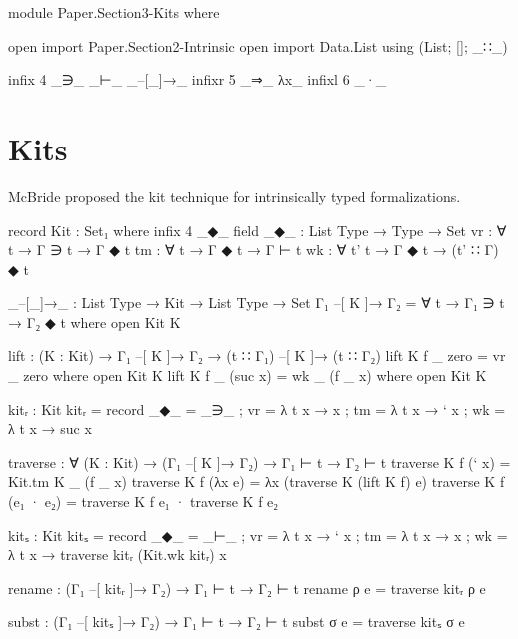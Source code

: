 \begin{code}[hide]
module Paper.Section3-Kits where

open import Paper.Section2-Intrinsic
open import Data.List using (List; []; _∷_)

infix  4  _∋_  _⊢_  _–[_]→_
infixr 5  _⇒_  λx_
infixl 6  _·_
\end{code}

\newpage
\section{Kits}

McBride proposed the kit technique for intrinsically typed formalizations.

\begin{code}
record Kit : Set₁ where
  infix 4 _◆_
  field
    _◆_  : List Type → Type → Set
    vr   : ∀ t → Γ ∋ t → Γ ◆ t
    tm   : ∀ t → Γ ◆ t → Γ ⊢ t
    wk   : ∀ {t'} t → Γ ◆ t → (t' ∷ Γ) ◆ t

_–[_]→_ : List Type → Kit → List Type → Set
Γ₁ –[ K ]→ Γ₂ = ∀ t → Γ₁ ∋ t → Γ₂ ◆ t where open Kit K

lift : (K : Kit) → Γ₁ –[ K ]→ Γ₂ → (t ∷ Γ₁) –[ K ]→ (t ∷ Γ₂)
lift K f _ zero    = vr _ zero     where open Kit K
lift K f _ (suc x) = wk _ (f _ x)  where open Kit K

kitᵣ : Kit
kitᵣ = record {  _◆_  =  _∋_
              ;  vr   = λ t x → x
              ;  tm   = λ t x → ` x
              ;  wk   = λ t x → suc x
              }

traverse : ∀ (K : Kit) → (Γ₁ –[ K ]→ Γ₂) → Γ₁ ⊢ t → Γ₂ ⊢ t
traverse K f (` x)      = Kit.tm K _ (f _ x)
traverse K f (λx e)     = λx (traverse K (lift K f) e)
traverse K f (e₁ · e₂)  = traverse K f e₁ · traverse K f e₂

kitₛ : Kit
kitₛ = record {  _◆_  = _⊢_
              ;  vr   = λ t x → ` x
              ;  tm   = λ t x → x
              ;  wk   = λ t x → traverse kitᵣ (Kit.wk kitᵣ) x
              }

rename : (Γ₁ –[ kitᵣ ]→ Γ₂) → Γ₁ ⊢ t → Γ₂ ⊢ t
rename ρ e = traverse kitᵣ ρ e

subst : (Γ₁ –[ kitₛ ]→ Γ₂) → Γ₁ ⊢ t → Γ₂ ⊢ t
subst σ e = traverse kitₛ σ e
\end{code}
